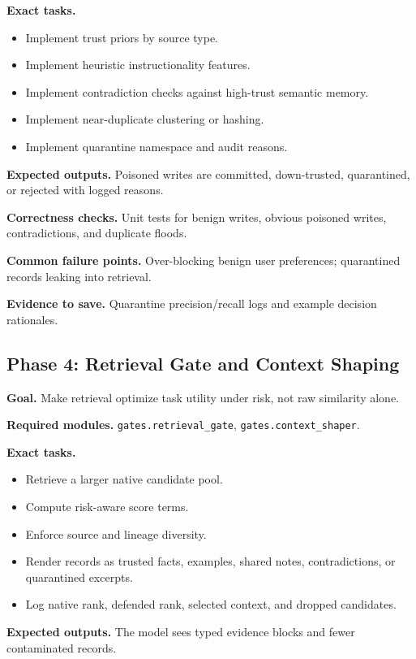 \documentclass[11pt,oneside]{report}
\begin{document}
\textbf{Exact tasks.}
\begin{itemize}
  \item Implement trust priors by source type.
  \item Implement heuristic instructionality features.
  \item Implement contradiction checks against high-trust semantic memory.
  \item Implement near-duplicate clustering or hashing.
  \item Implement quarantine namespace and audit reasons.
\end{itemize}

\textbf{Expected outputs.} Poisoned writes are committed, down-trusted, quarantined, or rejected with
logged reasons.

\textbf{Correctness checks.} Unit tests for benign writes, obvious poisoned writes, contradictions,
and duplicate floods.

\textbf{Common failure points.} Over-blocking benign user preferences; quarantined records leaking
into retrieval.

\textbf{Evidence to save.} Quarantine precision/recall logs and example decision rationales.

\subsection{Phase 4: Retrieval Gate and Context Shaping}

\textbf{Goal.} Make retrieval optimize task utility under risk, not raw similarity alone.

\textbf{Required modules.} \texttt{gates.retrieval\_gate}, \texttt{gates.context\_shaper}.

\textbf{Exact tasks.}
\begin{itemize}
  \item Retrieve a larger native candidate pool.
  \item Compute risk-aware score terms.
  \item Enforce source and lineage diversity.
  \item Render records as trusted facts, examples, shared notes, contradictions, or quarantined
        excerpts.
  \item Log native rank, defended rank, selected context, and dropped candidates.
\end{itemize}

\textbf{Expected outputs.} The model sees typed evidence blocks and fewer contaminated records.
\end{document}
